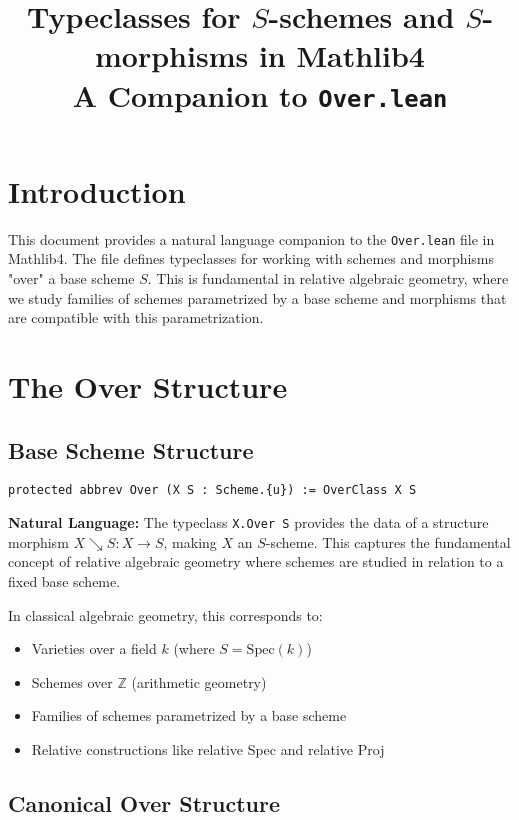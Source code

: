 \documentclass{article}
\title{Typeclasses for $S$-schemes and $S$-morphisms in Mathlib4\\
\large A Companion to \texttt{Over.lean}}
\author{}
\date{}
\theoremstyle{definition}
\begin{document}
\maketitle

\section{Introduction}

This document provides a natural language companion to the \texttt{Over.lean} file in Mathlib4. The file defines typeclasses for working with schemes and morphisms "over" a base scheme $S$. This is fundamental in relative algebraic geometry, where we study families of schemes parametrized by a base scheme and morphisms that are compatible with this parametrization.

\section{The Over Structure}

\subsection{Base Scheme Structure}

\begin{lstlisting}
protected abbrev Over (X S : Scheme.{u}) := OverClass X S
\end{lstlisting}

\textbf{Natural Language:} The typeclass \texttt{X.Over S} provides the data of a structure morphism $X \searrow S : X \to S$, making $X$ an $S$-scheme. This captures the fundamental concept of relative algebraic geometry where schemes are studied in relation to a fixed base scheme.

In classical algebraic geometry, this corresponds to:
\begin{itemize}
\item Varieties over a field $k$ (where $S = \mathrm{Spec}(k)$)
\item Schemes over $\mathbb{Z}$ (arithmetic geometry)
\item Families of schemes parametrized by a base scheme
\item Relative constructions like relative Spec and relative Proj
\end{itemize}

\subsection{Canonical Over Structure}
\end{document}
